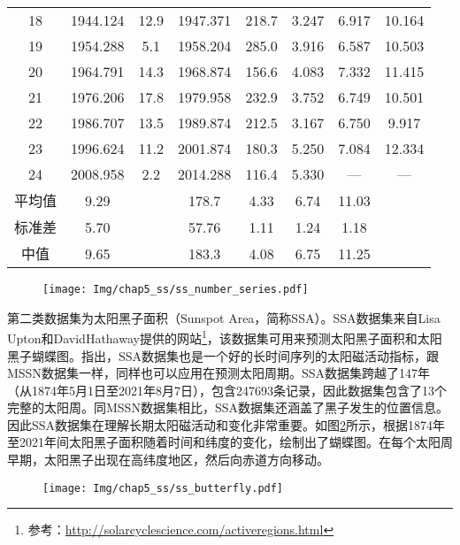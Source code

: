 \begin{table}[!htbp]
\begin{tabular}{cccccccc}
    18 & 1944.124 & 12.9 & 1947.371 & 218.7 & 3.247 & 6.917 & 10.164 \\
    19 & 1954.288 & 5.1 & 1958.204 & 285.0 & 3.916 & 6.587 & 10.503 \\
    20 & 1964.791 & 14.3 & 1968.874 & 156.6 & 4.083 & 7.332 & 11.415 \\
    21 & 1976.206 & 17.8 & 1979.958 & 232.9 & 3.752 & 6.749 & 10.501 \\
    22 & 1986.707 & 13.5 & 1989.874 & 212.5 & 3.167 & 6.750 & 9.917 \\
    23 & 1996.624 & 11.2 & 2001.874 & 180.3 & 5.250 & 7.084 & 12.334  \\
    24 & 2008.958 & 2.2 & 2014.288 & 116.4 & 5.330 & — & —  \\
    平均值 & 9.29 &  & 178.7 & 4.33 & 6.74 & 11.03  \\
    标准差 & 5.70 &  & 57.76 & 1.11 & 1.24 & 1.18 \\
    中值 & 9.65 &  & 183.3 & 4.08 & 6.75 & 11.25 \\
    \bottomrule
  \end{tabular}
\end{table}

\begin{figure}[!htbp]
    \centering
    \texttt{[image: Img/chap5\_ss/ss\_number\_series.pdf]}
    \vspace{-1.4cm}
    \label{fig:ss_number_series}
  \end{figure}

第二类数据集为太阳黑子面积（Sunspot Area，简称SSA）。SSA数据集来自Lisa Upton和DavidHathaway提供的网站\footnote{参考：\href{http://solarcyclescience.com/activeregions.html}{http://solarcyclescience.com/activeregions.html}}，该数据集可用来预测太阳黑子面积和太阳黑子蝴蝶图。\citet{hathaway2015solar}指出，SSA数据集也是一个好的长时间序列的太阳磁活动指标，跟MSSN数据集一样，同样也可以应用在预测太阳周期。SSA数据集跨越了147年（从1874年5月1日至2021年8月7日），包含247693条记录，因此数据集包含了13个完整的太阳周。同MSSN数据集相比，SSA数据集还涵盖了黑子发生的位置信息。因此SSA数据集在理解长期太阳磁活动和变化非常重要。如图\ref{fig:ss_butterfly}所示，根据1874年至2021年间太阳黑子面积随着时间和纬度的变化，绘制出了蝴蝶图。在每个太阳周早期，太阳黑子出现在高纬度地区，然后向赤道方向移动。

\begin{figure}[!htbp]
  \vspace{-0.3cm}
  \centering
  \texttt{[image: Img/chap5\_ss/ss\_butterfly.pdf]}
  \vspace{-1.4cm}
  \label{fig:ss_butterfly}
\end{figure}

